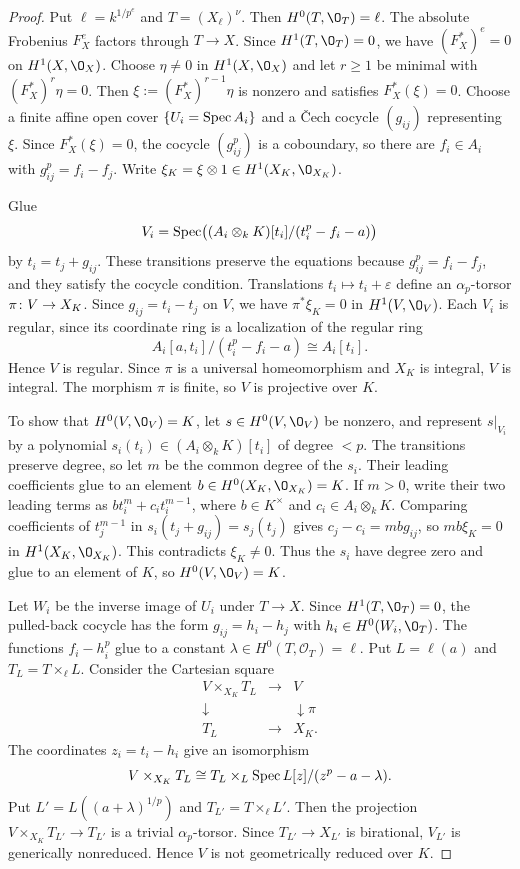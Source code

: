 \begin{proof}
Put $\ell = k^{1/p^e}$ and $T = (X_\ell)^\nu$.
Then $H^0(T,\O_T) = \ell$.
The absolute Frobenius $F_X^e$ factors through $T\to X$.
Since $H^1(T,\O_T) = 0$, we have $(F_X^*)^e = 0$ on $H^1(X,\O_X)$.
Choose $\eta\neq 0$ in $H^1(X,\O_X)$ and let $r\geq 1$ be minimal with $(F_X^*)^r\eta = 0$.
Then $\xi := (F_X^*)^{r-1}\eta$ is nonzero and satisfies $F_X^*(\xi) = 0$.
Choose a finite affine open cover $\{U_i = \operatorname{Spec} A_i\}$ and a \v{C}ech cocycle $(g_{ij})$ representing $\xi$.
Since $F_X^*(\xi) = 0$, the cocycle $(g_{ij}^p)$ is a coboundary, so there are $f_i\in A_i$ with $g_{ij}^p = f_i-f_j$.
Write $\xi_K = \xi\otimes 1\in H^1(X_K,\O_{X_K})$.

Glue
\[
  V_i = \operatorname{Spec}\bigl((A_i\otimes_kK)[t_i]/(t_i^p-f_i-a)\bigr)
\]
by $t_i = t_j+g_{ij}$.
These transitions preserve the equations because $g_{ij}^p = f_i-f_j$, and they satisfy the cocycle condition.
Translations $t_i\mapsto t_i+\varepsilon$ define an $\alpha_p$-torsor $\pi\colon V\to X_K$.
Since $g_{ij} = t_i-t_j$ on $V$, we have $\pi^*\xi_K = 0$ in $H^1(V,\O_V)$.
Each $V_i$ is regular, since its coordinate ring is a localization of the regular ring
\[
  A_i[a,t_i]/(t_i^p-f_i-a)\cong A_i[t_i].
\]
Hence $V$ is regular.
Since $\pi$ is a universal homeomorphism and $X_K$ is integral, $V$ is integral.
The morphism $\pi$ is finite, so $V$ is projective over $K$.

To show that $H^0(V,\O_V) = K$, let $s\in H^0(V,\O_V)$ be nonzero, and represent $s|_{V_i}$ by a polynomial $s_i(t_i)\in (A_i\otimes_kK)[t_i]$ of degree $<p$.
The transitions preserve degree, so let $m$ be the common degree of the $s_i$.
Their leading coefficients glue to an element $b\in H^0(X_K,\O_{X_K}) = K$.
If $m>0$, write their two leading terms as $bt_i^m+c_it_i^{m-1}$, where $b\in K^\times$ and $c_i\in A_i\otimes_kK$.
Comparing coefficients of $t_j^{m-1}$ in $s_i(t_j+g_{ij}) = s_j(t_j)$ gives $c_j-c_i = mbg_{ij}$, so $mb\xi_K = 0$ in $H^1(X_K,\O_{X_K})$.
This contradicts $\xi_K\neq 0$.
Thus the $s_i$ have degree zero and glue to an element of $K$, so $H^0(V,\O_V) = K$.

Let $W_i$ be the inverse image of $U_i$ under $T\to X$.
Since $H^1(T,\O_T) = 0$, the pulled-back cocycle has the form $g_{ij} = h_i-h_j$ with $h_i\in H^0(W_i,\O_T)$.
The functions $f_i-h_i^p$ glue to a constant $\lambda\in H^0(T,\mathcal O_T) = \ell$.
Put $L = \ell(a)$ and $T_L = T\times_\ell L$.
Consider the Cartesian square
\[
  \begin{array}{ccc}
    V\times_{X_K}T_L &\longrightarrow& V\\
    \downarrow &&\downarrow\pi\\
    T_L &\longrightarrow& X_K.
  \end{array}
\]
The coordinates $z_i = t_i-h_i$ give an isomorphism
\[
  V\times_{X_K}T_L\cong T_L\times_L\operatorname{Spec} L[z]/(z^p-a-\lambda).
\]
Put $L' = L((a+\lambda)^{1/p})$ and $T_{L'} = T\times_\ell L'$.
Then the projection $V\times_{X_K}T_{L'}\to T_{L'}$ is a trivial $\alpha_p$-torsor.
Since $T_{L'}\to X_{L'}$ is birational, $V_{L'}$ is generically nonreduced.
Hence $V$ is not geometrically reduced over $K$.


\end{proof}
